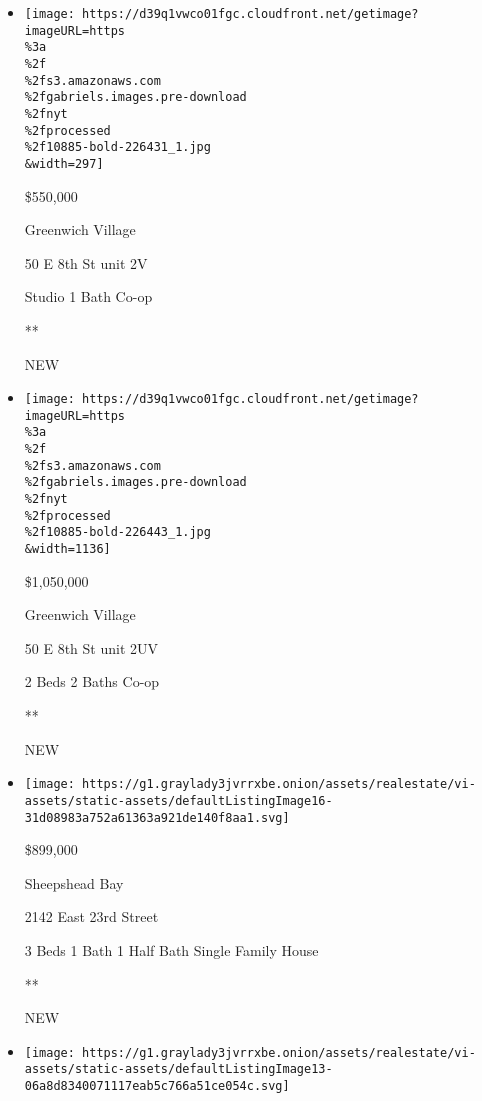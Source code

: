 \begin{itemize}
\item
  \href{/real-estate/usa/ny/new-york/greenwich-village/homes-for-sale/50-e-8th-st/10885-BOLD-226431?}{}

  \texttt{[image: https://d39q1vwco01fgc.cloudfront.net/getimage?imageURL=https\\\%3a\\\%2f\\\%2fs3.amazonaws.com\\\%2fgabriels.images.pre-download\\\%2fnyt\\\%2fprocessed\\\%2f10885-bold-226431\_1.jpg\\\&width=297]}

  \$550,000

  Greenwich Village

  50 E 8th St unit 2V

  Studio \textbar{} 1 Bath \textbar{} Co-op

  **

  NEW
\item
  \href{/real-estate/usa/ny/new-york/greenwich-village/homes-for-sale/50-e-8th-st/10885-BOLD-226443?}{}

  \texttt{[image: https://d39q1vwco01fgc.cloudfront.net/getimage?imageURL=https\\\%3a\\\%2f\\\%2fs3.amazonaws.com\\\%2fgabriels.images.pre-download\\\%2fnyt\\\%2fprocessed\\\%2f10885-bold-226443\_1.jpg\\\&width=1136]}

  \$1,050,000

  Greenwich Village

  50 E 8th St unit 2UV

  2 Beds \textbar{} 2 Baths \textbar{} Co-op

  **

  NEW
\item
  \href{/real-estate/usa/ny/brooklyn/sheepshead-bay/homes-for-sale/2142-east-23rd-street/15101-5537036?}{}

  \texttt{[image: https://g1.graylady3jvrrxbe.onion/assets/realestate/vi-assets/static-assets/defaultListingImage16-31d08983a752a61363a921de140f8aa1.svg]}

  \$899,000

  Sheepshead Bay

  2142 East 23rd Street

  3 Beds \textbar{} 1 Bath \textbar{} 1 Half Bath \textbar{} Single
  Family House

  **

  NEW
\item
  \href{/real-estate/usa/ny/queens/maspeth/homes-for-sale/64-21-60th-road/12436-OLRS-0061147?}{}

  \texttt{[image: https://g1.graylady3jvrrxbe.onion/assets/realestate/vi-assets/static-assets/defaultListingImage13-06a8d8340071117eab5c766a51ce054c.svg]}


\end{itemize}

